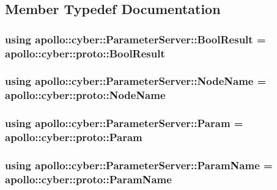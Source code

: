 \subsection{Member Typedef Documentation}
\hypertarget{classapollo_1_1cyber_1_1ParameterServer_a603661a34f7d6cff05fb6cf5618b96b9}{
\subsubsection[{Bool\-Result}]{\setlength{\rightskip}{0pt plus 5cm}using {\bf apollo\-::cyber\-::\-Parameter\-Server\-::\-Bool\-Result} =  apollo\-::cyber\-::proto\-::\-Bool\-Result}}\label{classapollo_1_1cyber_1_1ParameterServer_a603661a34f7d6cff05fb6cf5618b96b9}
\hypertarget{classapollo_1_1cyber_1_1ParameterServer_ac7ab499bb218b50675bb950b500bbae8}{
\subsubsection[{Node\-Name}]{\setlength{\rightskip}{0pt plus 5cm}using {\bf apollo\-::cyber\-::\-Parameter\-Server\-::\-Node\-Name} =  apollo\-::cyber\-::proto\-::\-Node\-Name}}\label{classapollo_1_1cyber_1_1ParameterServer_ac7ab499bb218b50675bb950b500bbae8}
\hypertarget{classapollo_1_1cyber_1_1ParameterServer_aabdbb6b8047a5748cb9e4f336650e303}{
\subsubsection[{Param}]{\setlength{\rightskip}{0pt plus 5cm}using {\bf apollo\-::cyber\-::\-Parameter\-Server\-::\-Param} =  apollo\-::cyber\-::proto\-::\-Param}}\label{classapollo_1_1cyber_1_1ParameterServer_aabdbb6b8047a5748cb9e4f336650e303}
\hypertarget{classapollo_1_1cyber_1_1ParameterServer_a9a36f8371c476a478cbce477c443aa16}{
\subsubsection[{Param\-Name}]{\setlength{\rightskip}{0pt plus 5cm}using {\bf apollo\-::cyber\-::\-Parameter\-Server\-::\-Param\-Name} =  apollo\-::cyber\-::proto\-::\-Param\-Name}}\label{classapollo_1_1cyber_1_1ParameterServer_a9a36f8371c476a478cbce477c443aa16}
